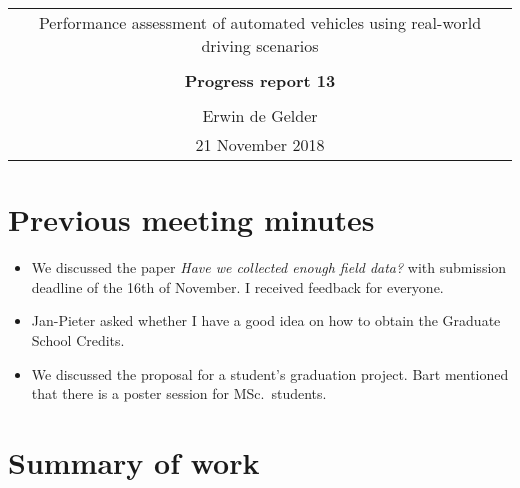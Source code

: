 \documentclass[10pt,final,a4paper,oneside,onecolumn]{article}
\newcommand{\progressreportnumber}{13}
\renewcommand{\author}{Erwin de Gelder}
\renewcommand{\date}{21 November 2018}
\renewcommand{\title}{Performance assessment of automated vehicles using real-world driving scenarios}
\begin{document}
	
\begin{center}
	\begin{tabular}{c}
		\title \\ \\
		\textbf{\huge Progress report \progressreportnumber} \\ \\
		\author \\ 
		\date
	\end{tabular}
\end{center}

\section{Previous meeting minutes}

\begin{itemize}
	\item We discussed the paper \emph{Have we collected enough field data?} with submission deadline of the 16th of November. I received feedback for everyone.
	
	\item Jan-Pieter asked whether I have a good idea on how to obtain the Graduate School Credits.
	
	\item We discussed the proposal for a student's graduation project. Bart mentioned that there is a poster session for MSc.\ students.
\end{itemize}

\section{Summary of work}
\end{document}
